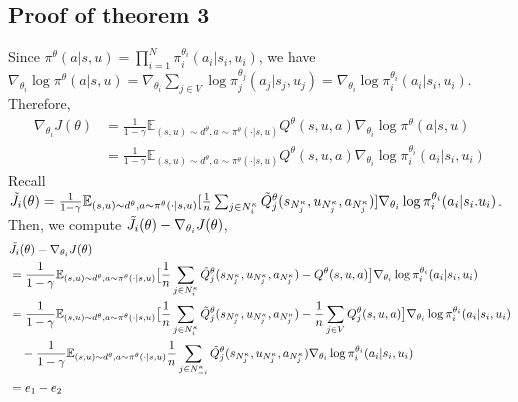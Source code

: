 \documentclass[conf]{new-aiaa}
\begin{document}
\subsection{Proof of theorem 3}
Since $\pi^\theta(a|s, u) = \prod_{i=1}^N \pi_i^{\theta_i} (a_i|s_i, u_i)$, we have $\nabla_{\theta_i} \log \pi^\theta(a|s,u) = \nabla_{\theta_i} \sum_{j \in V} \log \pi_j^{\theta_j}(a_j|s_j, u_j) = \nabla_{\theta_i} \log \pi_i^{\theta_i}(a_i|s_i, u_i)$. Therefore,
\begin{equation}
\begin{aligned}
    \nabla_{\theta_i} J(\theta) &= \frac{1}{1-\gamma} \mathbb{E}_{(s,u) \sim d^\theta, a \sim \pi^\theta(\cdot |s,u)} Q^\theta(s,u,a)  \nabla_{\theta_i} \log \pi^\theta(a|s,u) \\
    &= \frac{1}{1-\gamma} \mathbb{E}_{(s,u) \sim d^\theta, a \sim \pi^\theta(\cdot |s,u)} Q^\theta(s,u,a) \nabla_{\theta_i} \log \pi_i^{\theta_i}(a_i|s_i,u_i)
\end{aligned}
\end{equation}
Recall $\Tilde{J}_i(\theta) = \frac{1}{1-\gamma} \mathbb{E}_{(s,u) \sim d^\theta, a \sim \pi^\theta(\cdot |s,u)} [\frac{1}{n} \sum_{j \in N_i^\kappa} \Tilde{Q}_j^\theta(s_{N_j^\kappa}, u_{N_j^\kappa}, a_{N_j^\kappa})] \nabla_{\theta_i} \log \pi_i^{\theta_i}(a_i|s_i. u_i)$. Then, we compute $\Tilde{J}_i(\theta) - \nabla_{\theta_i} J(\theta)$,
\begin{equation}
\begin{aligned}
    & \Tilde{J}_i(\theta) - \nabla_{\theta_i} J(\theta) \\
    &= \frac{1}{1-\gamma} \mathbb{E}_{(s,u) \sim d^\theta, a \sim \pi^\theta(\cdot |s,u)} \big [\frac{1}{n} \sum_{j \in N_i^\kappa} \Tilde{Q}_j^\theta(s_{N_j^\kappa}, u_{N_j^\kappa}, a_{N_j^\kappa}) - Q^\theta(s,u,a) \big]  \nabla_{\theta_i} \log \pi_i^{\theta_i}(a_i|s_i,u_i) \\
    &= \frac{1}{1-\gamma} \mathbb{E}_{(s,u) \sim d^\theta, a \sim \pi^\theta(\cdot |s,u)} \big[\frac{1}{n} \sum_{j \in N_i^\kappa} \Tilde{Q}_j^\theta(s_{N_j^\kappa}, u_{N_j^\kappa}, a_{N_j^\kappa}) - \frac{1}{n} \sum_{j \in V}Q_j^\theta(s,u,a)\big]  \nabla_{\theta_i} \log \pi_i^{\theta_i}(a_i|s_i,u_i) \\
    & \quad -  \frac{1}{1-\gamma} \mathbb{E}_{(s,u) \sim d^\theta, a \sim \pi^\theta(\cdot |s,u)} \frac{1}{n} \sum_{j \in N_{-i}^\kappa} \Tilde{Q}_j^\theta(s_{N_j^\kappa}, u_{N_j^\kappa}, a_{N_j^\kappa})\nabla_{\theta_i} \log \pi_i^{\theta_i}(a_i|s_i,u_i)\\
    &= e_1 - e_2
\end{aligned}
\end{equation}
\end{document}
